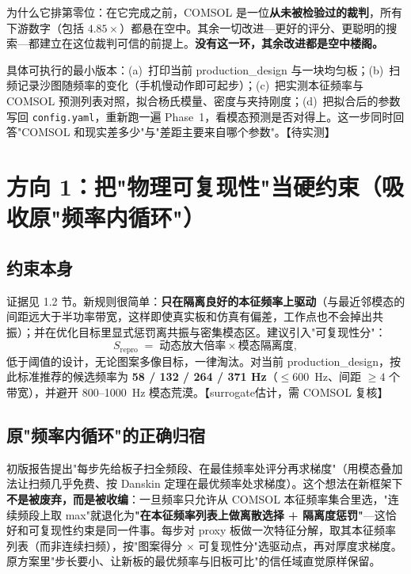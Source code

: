 \documentclass[11pt,a4paper]{article}
\newcommand{\code}[1]{\texttt{#1}}
\begin{document}
为什么它排第零位：在它完成之前，COMSOL 是一位\textbf{从未被检验过的裁判}，所有下游数字（包括 $4.85\times$）都悬在空中。其余一切改进---更好的评分、更聪明的搜索---都建立在这位裁判可信的前提上。\textbf{没有这一环，其余改进都是空中楼阁。}

具体可执行的最小版本：(a)~打印当前 production\_design 与一块均匀板；(b)~扫频记录沙图随频率的变化（手机慢动作即可起步）；(c)~把实测本征频率与 COMSOL 预测列表对照，拟合杨氏模量、密度与夹持刚度；(d)~把拟合后的参数写回 \code{config.yaml}，重新跑一遍 Phase~1，看模态预测是否对得上。这一步同时回答"COMSOL 和现实差多少"与"差距主要来自哪个参数"。【待实测】

\section{方向 1：把"物理可复现性"当硬约束（吸收原"频率内循环"）}

\subsection{约束本身}

证据见 1.2 节。新规则很简单：\textbf{只在隔离良好的本征频率上驱动}（与最近邻模态的间距远大于半功率带宽，这样即使真实板和仿真有偏差，工作点也不会掉出共振）；并在优化目标里显式惩罚离共振与密集模态区。建议引入"可复现性分"：
\begin{equation}
S_{\mathrm{repro}} \;=\; \text{动态放大倍率} \times \text{模态隔离度},
\end{equation}
低于阈值的设计，无论图案多像目标，一律淘汰。对当前 production\_design，按此标准推荐的候选频率为 \textbf{58 / 132 / 264 / 371 Hz}（$\le 600$~Hz、间距 $\ge 4$ 个带宽），并避开 800--1000~Hz 模态荒漠。【surrogate估计，需 COMSOL 复核】

\subsection{原"频率内循环"的正确归宿}

初版报告提出"每步先给板子扫全频段、在最佳频率处评分再求梯度"（用模态叠加法让扫频几乎免费、按 Danskin 定理在最优频率处求梯度）。这个想法在新框架下\textbf{不是被废弃，而是被收编}：一旦频率只允许从 COMSOL 本征频率集合里选，"连续频段上取 max"就退化为\textbf{"在本征频率列表上做离散选择 + 隔离度惩罚"}---这恰好和可复现性约束是同一件事。每步对 proxy 板做一次特征分解，取其本征频率列表（而非连续扫频），按"图案得分 $\times$ 可复现性分"选驱动点，再对厚度求梯度。原方案里"步长要小、让新板的最优频率与旧板可比"的信任域直觉原样保留。
\end{document}
